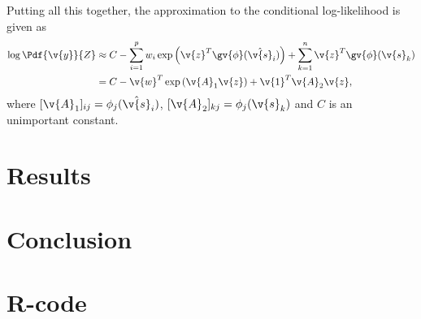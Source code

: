 \documentclass[12pt,a4paper,oneside,article]{memoir}
\begin{document}
Putting all this together, the approximation to the conditional log-likelihood is given
as
\begin{align}
	\log\Pdf{\v{y}}{Z}&\approx C-\sum_{i=1}^p w_i \exp\left(\v{z}^T\gv{\phi}(\hat{\v{s}}_i)\right)+
	\sum_{k=1}^n \v{z}^T\gv{\phi}(\v{s}_k)\\
	&=C-\v{w}^T\exp\left(\v{A}_1\v{z}\right)+\v{1}^T\v{A}_2\v{z},
	\label{eq:likelihood_approximation}
\end{align}
where $[\v{A}_1]_{ij}=\phi_j(\hat{\v{s}}_i)$, $[\v{A}_2]_{kj}=\phi_j(\v{s}_k)$ and
$C$ is an unimportant constant. 


\section{Results}

\section{Conclusion}
\clearpage
\printbibliography
\clearpage
\appendix
\section{R-code}



\end{document}
